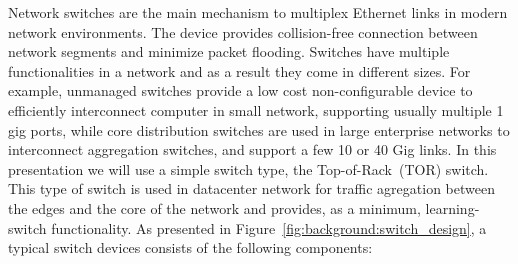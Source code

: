 Network switches are the main mechanism to multiplex Ethernet links in modern
network environments. The device provides collision-free connection between
network segments and minimize packet flooding.  Switches have multiple
functionalities in a network and as a result they come in different sizes. For
example, unmanaged switches provide a low cost non-configurable device to
efficiently interconnect computer in small network, supporting usually multiple
1 gig ports, while core distribution switches are used in large enterprise
networks to interconnect aggregation switches, and support a few 10 or 40 Gig
links.  In this presentation we will use a simple switch type, the
Top-of-Rack~(TOR) switch.  This type of switch is used in datacenter network for
traffic agregation between the edges and the core of the network and provides,
as a minimum, learning-switch functionality. As presented in
Figure~\ref{fig:background:switch_design}, a typical switch devices consists of
the following components:


